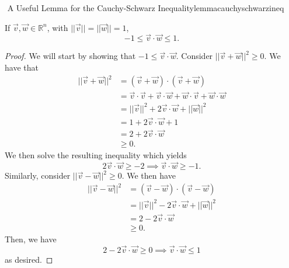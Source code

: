         \begin{theorem}{\Stop\,\,A Useful Lemma for the Cauchy-Schwarz Inequality}{lemmacauchyschwarzineq}
            
            If \(\vec{v},\vec{w}\in\mathbb{R}^n\), with \(||\vec{v}||=||\vec{w}||=1\), 
            \begin{equation*}
                -1\leq\vec{v}\cdot\vec{w}\leq 1.
            \end{equation*}
            \begin{proof}
                We will start by showing that \(-1\leq\vec{v}\cdot\vec{w}\). Consider \(||\vec{v}+\vec{w}||^2\geq0\). We have that 
                \begin{align*}
                    ||\vec{v}+\vec{w}||^2&=(\vec{v}+\vec{w})\cdot(\vec{v}+\vec{w}) \\
                    &=\vec{v}\cdot\vec{v}+\vec{v}\cdot\vec{w}+\vec{w}\cdot\vec{v}+\vec{w}\cdot\vec{w} \\
                    &=||\vec{v}||^2+2\vec{v}\cdot\vec{w}+||\vec{w}||^2 \\
                    &=1+2\vec{v}\cdot\vec{w}+1 \\
                    &=2+2\vec{v}\cdot\vec{w} \\
                    &\geq 0.
                \end{align*}
                We then solve the resulting inequality which yields
                \begin{equation*}
                    2\vec{v}\cdot\vec{w}\geq-2 \implies \vec{v}\cdot\vec{w}\geq -1.
                \end{equation*}
                Similarly, consider \(||\vec{v}-\vec{w}||^2\geq0\). We then have
                \begin{align*}
                    ||\vec{v}-\vec{w}||^2&=(\vec{v}-\vec{w})\cdot(\vec{v}-\vec{w}) \\
                    &=||\vec{v}||^2-2\vec{v}\cdot\vec{w}+||\vec{w}||^2 \\
                    &=2-2\vec{v}\cdot\vec{w} \\
                    &\geq 0.
                \end{align*}
                Then, we have
                \begin{equation*}
                    2-2\vec{v}\cdot\vec{w}\geq 0 \implies \vec{v}\cdot\vec{w}\leq 1
                \end{equation*}
                as desired.
            \end{proof}

        \end{theorem}
